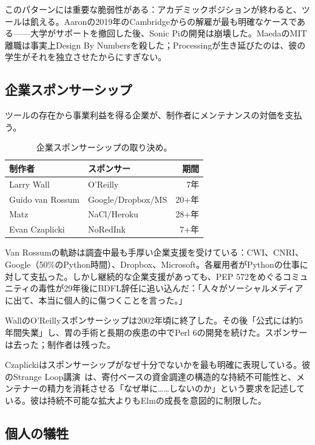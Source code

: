 \documentclass[10pt,letterpaper,twocolumn]{article}
\begin{document}
このパターンには重要な脆弱性がある：アカデミックポジションが終わると、ツールは飢える。Aaronの2019年のCambridgeからの解雇が最も明確なケースである——大学がサポートを撤回した後、Sonic Piの開発は崩壊した。MaedaのMIT離職は事実上Design By Numbersを殺した；Processingが生き延びたのは、彼の学生がそれを独立させたからにすぎない。

\subsection{企業スポンサーシップ}

ツールの存在から事業利益を得る企業が、制作者にメンテナンスの対価を支払う。

\begin{table}[h]
\small
\centering
\begin{tabularx}{\columnwidth}{Xlr}
\toprule
\textbf{制作者} & \textbf{スポンサー} & \textbf{期間} \\
\midrule
Larry Wall & O'Reilly & 7年 \\
Guido van Rossum & Google/Dropbox/MS & 20+年 \\
Matz & NaCl/Heroku & 28+年 \\
Evan Czaplicki & NoRedInk & 7+年 \\
\bottomrule
\end{tabularx}
\caption{企業スポンサーシップの取り決め。}
\label{tab:corporate}
\end{table}

Van Rossumの軌跡は調査中最も手厚い企業支援を受けている：CWI、CNRI、Google（50\%のPython時間）、Dropbox、Microsoft。各雇用者がPythonの仕事に対して支払った。しかし継続的な企業支援があっても、PEP 572をめぐるコミュニティの毒性が29年後にBDFL辞任に追い込んだ：「人々がソーシャルメディアに出て、本当に個人的に傷つくことを言った。」

WallのO'Reillyスポンサーシップは2002年頃に終了した。その後「公式には約5年間失業」し、胃の手術と長期の疾患の中でPerl 6の開発を続けた。スポンサーは去った；制作者は残った。

Czaplickiはスポンサーシップがなぜ十分でないかを最も明確に表現している。彼のStrange Loop講演~\citep{czaplicki2018hard, czaplicki2023economics}は、寄付ベースの資金調達の構造的な持続不可能性と、メンテナーの精力を消耗させる「なぜ単に……しないのか」という要求を記述している。彼は持続不可能な拡大よりもElmの成長を意図的に制限した。

\subsection{個人の犠牲}
\end{document}
